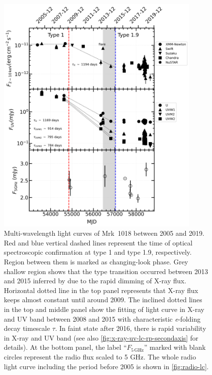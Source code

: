 \documentclass[twocolumn]{aastex63}
\begin{document}
\begin{figure}
\centering
	\includegraphics[width=0.9\textwidth]{./pic/subplots-xrt_uvot-radio-second.png}
    \caption{Multi-wavelength light curves of Mrk~1018 between 2005 and 2019. Red and blue vertical dashed lines represent the time of optical spectroscopic confirmation at type 1 and type 1.9, respectively. Region between them is marked as changing-look phase. Grey shallow region shows that the type transition occurred between 2013 and 2015 inferred by \citet{2017A&A...607L...9K} due to the rapid dimming of X-ray flux. Horizontal dotted line in the top panel represents that X-ray flux keeps almost constant until around 2009. The inclined dotted lines in the top and middle panel show the fitting of light curve in X-ray and UV band between 2008 and 2015 with characteristic \textit{e}-folding decay timescale $\tau$. In faint state after 2016, there is rapid variability in X-ray and UV band (see also \autoref{fig:x-ray-uv-lc-rp-secondaxis} for details). At the bottom panel, the label ``$F_\mathrm{5\,GHz}$'' marked with blank circles represent the radio flux scaled to 5 GHz. The whole radio light curve including the period before 2005 is shown in \autoref{fig:radio-lc}.}
    \label{fig:multi-lc-secondaxis}
\end{figure}
\end{document}
